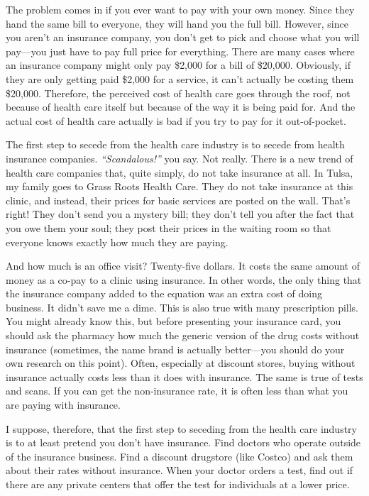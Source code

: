 The problem comes in if you ever want to pay with your own money. Since
they hand the same bill to everyone, they will hand you the full bill.
However, since you aren't an insurance company, you
don't get to pick and choose what you will pay—you
just have to pay full price for everything. There are many cases where
an insurance company might only pay \$2,000 for a bill of \$20,000.
Obviously, if they are only getting paid \$2,000 for a service, it
can't actually be costing them \$20,000. Therefore,
the perceived cost of health care goes through the roof, not because of
health care itself but because of the way it is being paid for. And the
actual cost of health care actually is bad if you try to pay for it
out-of-pocket.

The first step to secede from the health care industry is to secede from
health insurance companies.
\textit{“}\textit{Scandalous!”
}you say. Not really.
There is a new trend of health care companies that, quite simply, do
not take insurance at all. In Tulsa, my family goes to Grass Roots
Health Care.  They do not take insurance at this clinic, and instead,
their prices for basic services are posted on the wall. 
That's
right! They
don't send you a mystery bill; they
don't tell you after the fact that you owe them your
soul; they post their prices in the waiting room so that everyone knows
exactly how much they are paying.

And how much is an office visit?  Twenty-five dollars. It costs the same
amount of money as a co-pay to a clinic using insurance. In other
words, the only thing that the insurance company added to the equation
was an extra cost of doing business. It didn't save me
a dime. This is also true with many prescription pills.
You might already know
this, but before presenting your insurance card, you should ask the
pharmacy how much the generic version of the drug costs without
insurance (sometimes, the name brand is actually better---you should
do your own research on this point). 
Often, especially at discount stores, buying without insurance 
actually costs less than
it does with insurance.  The same is true of tests and scans. If
you can get the non-insurance rate, it is often less than what you are
paying with insurance.

I suppose, therefore,
that the
first step to seceding from the health care industry is to at least
pretend you don't have insurance. Find doctors who
operate outside of the insurance business. Find a discount drugstore
(like Costco) and ask them about their rates without insurance. When
your doctor orders a test, find out if there are any private centers
that offer the test for individuals at a lower price. 

